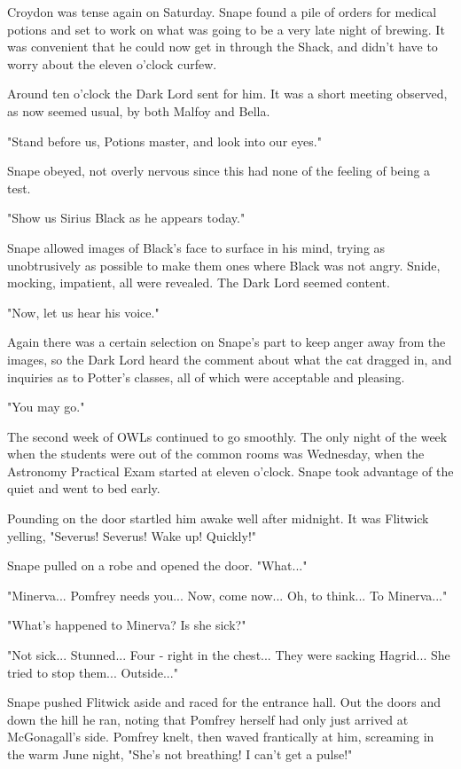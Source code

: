 \documentclass[a4paper,11pt]{article}
\begin{document}
Croydon was tense again on Saturday. Snape found a pile of orders for medical potions and set to work on what was going to be a very late night of brewing. It was convenient that he could now get in through the Shack, and didn't have to worry about the eleven o'clock curfew.

Around ten o'clock the Dark Lord sent for him. It was a short meeting observed, as now seemed usual, by both Malfoy and Bella.

"Stand before us, Potions master, and look into our eyes."

Snape obeyed, not overly nervous since this had none of the feeling of being a test.

"Show us Sirius Black as he appears today."

Snape allowed images of Black's face to surface in his mind, trying as unobtrusively as possible to make them ones where Black was not angry. Snide, mocking, impatient, all were revealed. The Dark Lord seemed content.

"Now, let us hear his voice."

Again there was a certain selection on Snape's part to keep anger away from the images, so the Dark Lord heard the comment about what the cat dragged in, and inquiries as to Potter's classes, all of which were acceptable and pleasing.

"You may go."

The second week of OWLs continued to go smoothly. The only night of the week when the students were out of the common rooms was Wednesday, when the Astronomy Practical Exam started at eleven o'clock. Snape took advantage of the quiet and went to bed early.

Pounding on the door startled him awake well after midnight. It was Flitwick yelling, "Severus! Severus! Wake up! Quickly!"

Snape pulled on a robe and opened the door. "What..."

"Minerva... Pomfrey needs you... Now, come now... Oh, to think... To Minerva..."

"What's happened to Minerva? Is she sick?"

"Not sick... Stunned... Four - right in the chest... They were sacking Hagrid... She tried to stop them... Outside..."

Snape pushed Flitwick aside and raced for the entrance hall. Out the doors and down the hill he ran, noting that Pomfrey herself had only just arrived at McGonagall's side. Pomfrey knelt, then waved frantically at him, screaming in the warm June night, "She's not breathing! I can't get a pulse!"
\end{document}
